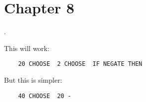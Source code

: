 \section{Chapter 8}
\setcounter{exercise}{0}
\begin{list}%
{.}{
    \setlength{\rightmargin}{\leftmargin}}
\item This will work:
\begin{verbatim}
    20 CHOOSE  2 CHOOSE  IF NEGATE THEN
\end{verbatim}
But this is simpler:
\begin{verbatim}
    40 CHOOSE  20 -
\end{verbatim}
\end{list}
